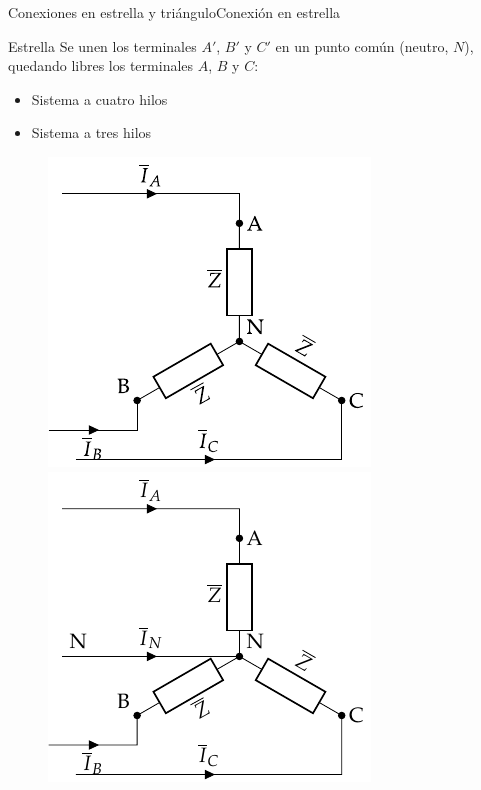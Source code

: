 \documentclass[aspectratio=169, xcolor={usenames,svgnames,dvipsnames}]{beamer}
\begin{document}
\begin{frame}{Conexiones en estrella y triángulo}{Conexión en estrella}
\begin{block}{Estrella}
    Se unen los terminales $A'$, $B'$ y $C'$ en un punto común (\alert{neutro}, $N$), quedando libres los terminales $A$, $B$ y $C$:
    \begin{itemize}
        \item Sistema a cuatro hilos
        \item Sistema a tres hilos
    \end{itemize}
\end{block}

\begin{figure}
		\centering
		{\includegraphics[width=0.25\linewidth]{../figs/EstrellaEquilibrado_Receptor_SN.pdf}}\hfil
		{\includegraphics[width=0.25\linewidth]{../figs/EstrellaEquilibrado_Receptor.pdf}}
	\end{figure}
\end{frame}
\end{document}
